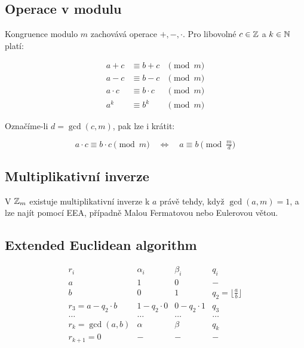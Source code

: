 \subsection{Operace v modulu}

Kongruence modulo $m$ zachovává operace $+,-,\cdot$. Pro libovolné $c \in \mathbb{Z}$ a $k \in \mathbb{N}$ platí:

\[
    \begin{array}{rll}
        a + c     & \equiv b + c     & \pmod m \\
        a - c     & \equiv b - c     & \pmod m \\
        a \cdot c & \equiv b \cdot c & \pmod m \\
        a^k       & \equiv b^k       & \pmod m
    \end{array}
\]

Označíme-li $d = \gcd(c, m)$, pak lze i krátit:

\[
    a \cdot c \equiv b \cdot c \pmod m
    \quad\Leftrightarrow\quad
    a \equiv b \pmod{\tfrac{m}{d}}
\]

\subsection{Multiplikativní inverze}

V $\mathbb{Z}_m$ existuje multiplikativní inverze k $a$ právě tehdy, když $\gcd(a,m)=1$, a lze najít pomocí EEA, případně Malou Fermatovou nebo Eulerovou větou.

\subsection{Extended Euclidean algorithm}

\[
    \begin{array}{c|cc|c}
        r_i              & \alpha_i    & \beta_i     & q_i                            \\[1.5mm] \hline
        a                & 1           & 0           & -                              \\[1.5mm]
        b                & 0           & 1           & q_2=\lfloor\tfrac{a}{b}\rfloor \\[1.5mm] \hline
        r_3=a-q_2\cdot b & 1-q_2\cdot0 & 0-q_2\cdot1 & q_3                            \\[1.5mm]
        \dots            & \dots       & \dots       & \dots                          \\[1.5mm]
        r_k=\gcd(a,b)    & \alpha      & \beta       & q_k                            \\[1.5mm]
        r_{k+1}=0        & -           & -           & -                              \\[1.5mm]
    \end{array}
\]

